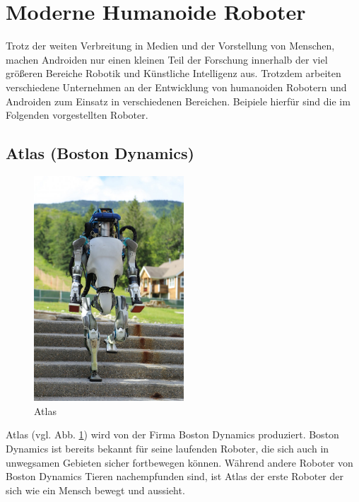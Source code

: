 \section{Moderne Humanoide Roboter}\label{sec:moderne-humanoide-roboter}
Trotz der weiten Verbreitung in Medien und der Vorstellung von
Menschen, machen Androiden nur einen kleinen Teil der Forschung innerhalb der
viel größeren Bereiche Robotik und Künstliche Intelligenz aus.
\cite{Dautenhahn2011} Trotzdem arbeiten verschiedene Unternehmen an der
Entwicklung von humanoiden Robotern und Androiden zum Einsatz in verschiedenen
Bereichen. Beipiele hierfür sind die im Folgenden vorgestellten Roboter.

\subsection{Atlas (Boston Dynamics)}
\begin{figure}
  \centering
     \includegraphics[width=0.5\textwidth]{atlas}
  \caption{Atlas}
  \label{fig:atlas}
\end{figure}
Atlas (vgl. Abb. \ref{fig:atlas}) wird von der Firma Boston Dynamics produziert.
Boston Dynamics ist bereits bekannt für seine laufenden Roboter, die sich auch in unwegsamen Gebieten sicher
fortbewegen können. Während andere Roboter von Boston Dynamics Tieren
nachempfunden sind, ist Atlas der erste Roboter der sich wie ein Mensch bewegt
und aussieht.

